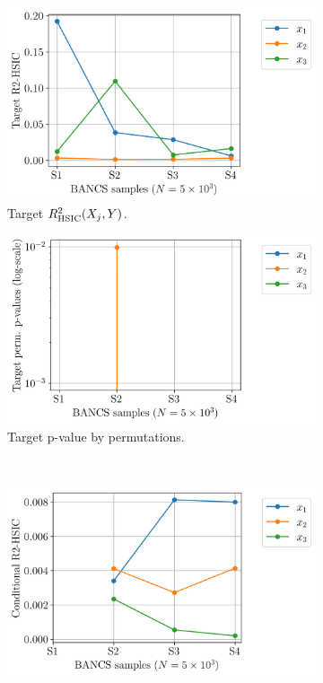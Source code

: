 \begin{figure}
    \centering
    \begin{subfigure}[b]{0.4\linewidth}
        \centering
        \includegraphics[width=\linewidth]{part3/figures/BANCS/ishigami_TR2HSIC.png}
        \caption{Target $R^2_{\mathrm{HSIC}}(X_j, Y)$.}
    \end{subfigure}
    \begin{subfigure}[b]{0.4\linewidth}
        \centering
        \includegraphics[width=\linewidth]{part3/figures/BANCS/ishigami_Tpvalue_permutation.png}
        \caption{Target p-value by permutations.}
    \end{subfigure}
    \\
    \begin{subfigure}[b]{0.4\linewidth}
        \centering
        \includegraphics[width=\linewidth]{part3/figures/BANCS/ishigami_CR2HSIC.png}

\end{subfigure}
\end{figure}
